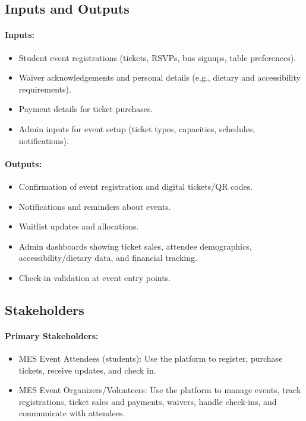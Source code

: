 \documentclass{article}
\begin{document}
\subsection{Inputs and Outputs}

\paragraph{Inputs:}
\begin{itemize}
    \item Student event registrations (tickets, RSVPs, bus signups, table preferences).
    \item Waiver acknowledgements and personal details (e.g., dietary and accessibility requirements).
    \item Payment details for ticket purchases.
    \item Admin inputs for event setup (ticket types, capacities, schedules, notifications).
\end{itemize}


\paragraph{Outputs:}
\begin{itemize}
    \item Confirmation of event registration and digital tickets/QR codes.
    \item Notifications and reminders about events.
    \item Waitlist updates and allocations.
    \item Admin dashboards showing ticket sales, attendee demographics, accessibility/dietary data, and financial tracking.
    \item Check-in validation at event entry points.
\end{itemize}


\subsection{Stakeholders}
\paragraph{Primary Stakeholders:}
\begin{itemize}
    \item MES Event Attendees (students): Use the platform to register, purchase tickets, receive updates,
        and check in.
    \item MES Event Organizers/Volunteers: Use the platform to manage events, track registrations, ticket
     sales and payments, waivers, handle check-ins, and communicate with attendees.
\end{itemize}
\end{document}
